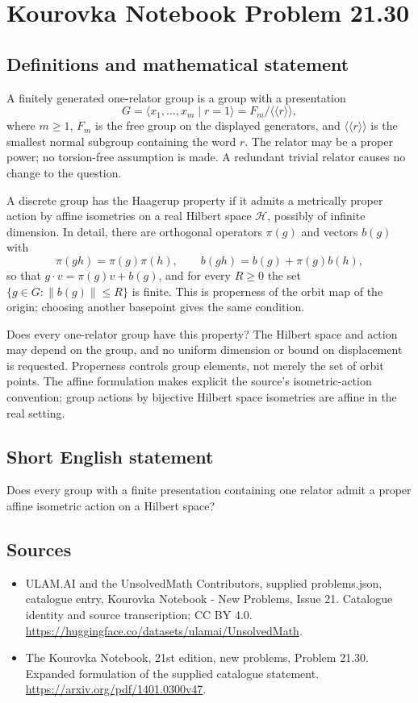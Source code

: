 \documentclass[11pt,a4paper]{article}
\begin{document}
\section*{Kourovka Notebook Problem 21.30}\label{statement}

\subsection{Definitions and mathematical statement}
A finitely generated one-relator group is a group with a presentation
\[
 G=\langle x_1,\ldots,x_m\mid r=1\rangle
       =F_m/\langle\!\langle r\rangle\!\rangle,
\]
where $m\ge1$, $F_m$ is the free group on the displayed generators,
and $\langle\!\langle r\rangle\!\rangle$ is the smallest normal subgroup
containing the word $r$. The relator may be a proper power; no torsion-free
assumption is made. A redundant trivial relator causes no change to the
question.

A discrete group has the Haagerup property if it admits a metrically
proper action by affine isometries on a real Hilbert space $\mathcal H$,
possibly of infinite dimension. In detail, there are orthogonal operators
$\pi(g)$ and vectors $b(g)$ with
\[
 \pi(gh)=\pi(g)\pi(h),\qquad
 b(gh)=b(g)+\pi(g)b(h),
\]
so that $g\cdot v=\pi(g)v+b(g)$, and for every $R\ge0$ the set
$\{g\in G:\|b(g)\|\le R\}$ is finite. This is properness of the orbit
map of the origin; choosing another basepoint gives the same condition.

Does every one-relator group have this property? The Hilbert space and
action may depend on the group, and no uniform dimension or bound on
displacement is requested. Properness controls group elements, not merely
the set of orbit points. The affine formulation makes explicit the
source's isometric-action convention; group actions by bijective Hilbert
space isometries are affine in the real setting.
\subsection{Short English statement}
Does every group with a finite presentation containing one relator admit a proper affine isometric action on a Hilbert space?
\subsection{Sources}
\begin{itemize}
\item[S1] ULAM.AI and the UnsolvedMath Contributors, supplied problems.json, catalogue entry, Kourovka Notebook - New Problems, Issue 21. Catalogue identity and source transcription; CC BY 4.0.
\url{https://huggingface.co/datasets/ulamai/UnsolvedMath}.
\item[S2] The Kourovka Notebook, 21st edition, new problems, Problem 21.30. Expanded formulation of the supplied catalogue statement.
\url{https://arxiv.org/pdf/1401.0300v47}.
\end{itemize}
\end{document}
